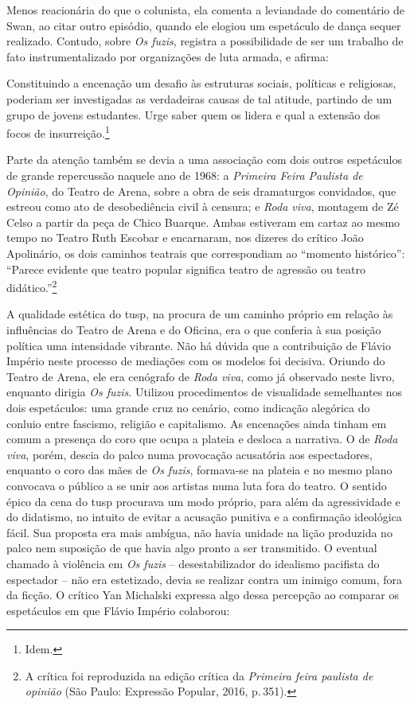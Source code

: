 Menos reacionária do que o colunista, ela comenta a leviandade do
comentário de Swan, ao citar outro episódio, quando ele elogiou um
espetáculo de dança sequer realizado. Contudo, sobre {\it Os fuzis},
registra a possibilidade de ser um trabalho de fato instrumentalizado
por organizações de luta armada, e afirma:

\startblockquote
Constituindo a encenação um desafio às estruturas sociais, políticas e
religiosas, poderiam ser investigadas as verdadeiras causas de tal
atitude, partindo de um grupo de jovens estudantes. Urge saber quem os
lidera e qual a extensão dos focos de insurreição.\footnote{Idem.}
\stopblockquote

Parte da atenção também se devia a uma associação com dois outros
espetáculos de grande repercussão naquele ano de 1968: a {\it Primeira
Feira Paulista de Opinião}, do Teatro de Arena, sobre a obra de seis
dramaturgos convidados, que estreou como ato de desobediência civil à
censura; e {\it Roda viva}, montagem de Zé Celso a partir da peça de
Chico Buarque. Ambas estiveram em cartaz ao mesmo tempo no Teatro Ruth
Escobar e encarnaram, nos dizeres do crítico João Apolinário, os dois
caminhos teatrais que correspondiam ao “momento histórico”: “Parece
evidente que teatro popular significa teatro de agressão ou teatro
didático.”\footnote{A crítica foi reproduzida na edição crítica da
  {\it Primeira feira paulista de opinião} (São Paulo: Expressão
  Popular, 2016, p.\,351).}

A qualidade estética do {\sc tusp}, na procura de um caminho próprio em
relação às influências do Teatro de Arena e do Oficina, era o que
conferia à sua posição política uma intensidade vibrante. Não há dúvida
que a contribuição de Flávio Império neste processo de mediações com os
modelos foi decisiva. Oriundo do Teatro de Arena, ele era cenógrafo de
{\it Roda viva}, como já observado neste livro, enquanto dirigia {\it Os
fuzis}. Utilizou procedimentos de visualidade semelhantes nos dois
espetáculos: uma grande cruz no cenário, como indicação alegórica do
conluio entre fascismo, religião e capitalismo. As encenações ainda
tinham em comum a presença do coro que ocupa a plateia e desloca a
narrativa. O de {\it Roda viva}, porém, descia do palco numa provocação
acusatória aos espectadores, enquanto o coro das mães de {\it Os fuzis},
formava-se na plateia e no mesmo plano convocava o público a se unir aos
artistas numa luta fora do teatro. O sentido épico da cena do {\sc tusp}
procurava um modo próprio, para além da agressividade e do didatismo, no
intuito de evitar a acusação punitiva e a confirmação ideológica fácil.
Sua proposta era mais ambígua, não havia unidade na lição produzida no
palco nem suposição de que havia algo pronto a ser transmitido. O
eventual chamado à violência em {\it Os fuzis} -- desestabilizador do
idealismo pacifista do espectador -- não era estetizado, devia se
realizar contra um inimigo comum, fora da ficção. O crítico Yan
Michalski expressa algo dessa percepção ao comparar os espetáculos em
que Flávio Império colaborou:

